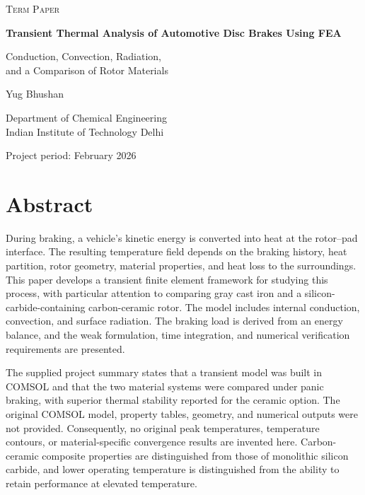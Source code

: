 \documentclass[11pt,a4paper]{article}
\begin{document}
\begin{titlepage}\centering\vspace*{22mm}
{\Large\scshape Term Paper\par}\vspace{16mm}
{\huge\bfseries Transient Thermal Analysis of Automotive Disc Brakes Using FEA\par}\vspace{10mm}
{\large Conduction, Convection, Radiation,\\and a Comparison of Rotor Materials\par}\vspace{24mm}
{\Large Yug Bhushan\par}\vspace{3mm}{\large 2025CH71601\par}\vspace{7mm}
Department of Chemical Engineering\\Indian Institute of Technology Delhi
\vfill{\large Project period: February 2026\par}\vspace{12mm}
\end{titlepage}

\section*{Abstract}
During braking, a vehicle's kinetic energy is converted into heat at the rotor--pad interface. The resulting temperature field depends on the braking history, heat partition, rotor geometry, material properties, and heat loss to the surroundings. This paper develops a transient finite element framework for studying this process, with particular attention to comparing gray cast iron and a silicon-carbide-containing carbon-ceramic rotor. The model includes internal conduction, convection, and surface radiation. The braking load is derived from an energy balance, and the weak formulation, time integration, and numerical verification requirements are presented.

The supplied project summary states that a transient model was built in COMSOL and that the two material systems were compared under panic braking, with superior thermal stability reported for the ceramic option. The original COMSOL model, property tables, geometry, and numerical outputs were not provided. Consequently, no original peak temperatures, temperature contours, or material-specific convergence results are invented here. Carbon-ceramic composite properties are distinguished from those of monolithic silicon carbide, and lower operating temperature is distinguished from the ability to retain performance at elevated temperature.
\end{document}
